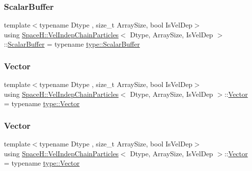 \subsubsection{\texorpdfstring{Scalar\+Buffer}{ScalarBuffer}\hspace{0.1cm}{\footnotesize\ttfamily [2/2]}}
{\footnotesize\ttfamily template$<$typename Dtype , size\+\_\+t Array\+Size, bool Is\+Vel\+Dep$>$ \\
using \mbox{\hyperlink{class_space_h_1_1_vel_indep_chain_particles}{Space\+H\+::\+Vel\+Indep\+Chain\+Particles}}$<$ Dtype, Array\+Size, Is\+Vel\+Dep $>$\+::\mbox{\hyperlink{class_space_h_1_1_vel_indep_particles_abca40159a816385790d5a6fd19c1dc6d}{Scalar\+Buffer}} =  typename \mbox{\hyperlink{struct_space_h_1_1_proto_type_a62c491884996da10377d348a5aabad86}{type\+::\+Scalar\+Buffer}}}

\mbox{\label{class_space_h_1_1_vel_indep_chain_particles_a60fc302e36d670adbff46907a1d8180a}} 
\subsubsection{\texorpdfstring{Vector}{Vector}\hspace{0.1cm}{\footnotesize\ttfamily [1/2]}}
{\footnotesize\ttfamily template$<$typename Dtype , size\+\_\+t Array\+Size, bool Is\+Vel\+Dep$>$ \\
using \mbox{\hyperlink{class_space_h_1_1_vel_indep_chain_particles}{Space\+H\+::\+Vel\+Indep\+Chain\+Particles}}$<$ Dtype, Array\+Size, Is\+Vel\+Dep $>$\+::\mbox{\hyperlink{class_space_h_1_1_vel_indep_particles_a61bbcfdb0dc7f99f3c68af69a755c935}{Vector}} =  typename \mbox{\hyperlink{struct_space_h_1_1_proto_type_a316b81f4660b2b4fab14a8e1f23b6089}{type\+::\+Vector}}}

\mbox{\label{class_space_h_1_1_vel_indep_chain_particles_a60fc302e36d670adbff46907a1d8180a}} 
\subsubsection{\texorpdfstring{Vector}{Vector}\hspace{0.1cm}{\footnotesize\ttfamily [2/2]}}
{\footnotesize\ttfamily template$<$typename Dtype , size\+\_\+t Array\+Size, bool Is\+Vel\+Dep$>$ \\
using \mbox{\hyperlink{class_space_h_1_1_vel_indep_chain_particles}{Space\+H\+::\+Vel\+Indep\+Chain\+Particles}}$<$ Dtype, Array\+Size, Is\+Vel\+Dep $>$\+::\mbox{\hyperlink{class_space_h_1_1_vel_indep_particles_a61bbcfdb0dc7f99f3c68af69a755c935}{Vector}} =  typename \mbox{\hyperlink{struct_space_h_1_1_proto_type_a316b81f4660b2b4fab14a8e1f23b6089}{type\+::\+Vector}}}

